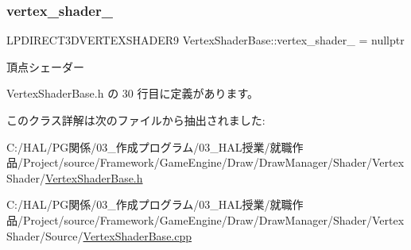 \subsubsection{\texorpdfstring{vertex\+\_\+shader\+\_\+}{vertex\_shader\_}}
{\footnotesize\ttfamily L\+P\+D\+I\+R\+E\+C\+T3\+D\+V\+E\+R\+T\+E\+X\+S\+H\+A\+D\+E\+R9 Vertex\+Shader\+Base\+::vertex\+\_\+shader\+\_\+ = nullptr\hspace{0.3cm}{\ttfamily [private]}}



頂点シェーダー 



 Vertex\+Shader\+Base.\+h の 30 行目に定義があります。



このクラス詳解は次のファイルから抽出されました\+:\begin{DoxyCompactItemize}
\item 
C\+:/\+H\+A\+L/\+P\+G関係/03\+\_\+作成プログラム/03\+\_\+\+H\+A\+L授業/就職作品/\+Project/source/\+Framework/\+Game\+Engine/\+Draw/\+Draw\+Manager/\+Shader/\+Vertex\+Shader/\mbox{\hyperlink{_vertex_shader_base_8h}{Vertex\+Shader\+Base.\+h}}\item 
C\+:/\+H\+A\+L/\+P\+G関係/03\+\_\+作成プログラム/03\+\_\+\+H\+A\+L授業/就職作品/\+Project/source/\+Framework/\+Game\+Engine/\+Draw/\+Draw\+Manager/\+Shader/\+Vertex\+Shader/\+Source/\mbox{\hyperlink{_vertex_shader_base_8cpp}{Vertex\+Shader\+Base.\+cpp}}\end{DoxyCompactItemize}
